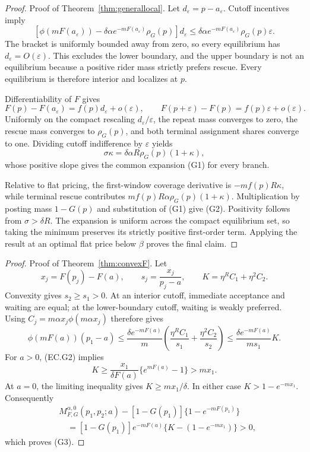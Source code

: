 \documentclass[mnsc,blindrev]{informs3}
\newcommand{\ph}{\phi}
\begin{document}
\begin{proof}{Proof of Theorem~\ref{thm:generallocal}.}
Let \(d_\varepsilon=p-a_\varepsilon\).  Cutoff incentives imply
\[
 [\ph(mF(a_\varepsilon))
 -\delta\alpha e^{-mF(a_\varepsilon)}\rho_G(p)]
 d_\varepsilon
 \le\delta\alpha e^{-mF(a_\varepsilon)}
 \rho_G(p)\varepsilon.                                   \tag{EC.G1}
\]
The bracket is uniformly bounded away from zero, so every equilibrium has
\(d_\varepsilon=O(\varepsilon)\).  This excludes the lower boundary, and the
upper boundary is not an equilibrium because a positive rider mass strictly
prefers rescue.  Every equilibrium is therefore interior and localizes at
\(p\).

Differentiability of \(F\) gives
\[
 F(p)-F(a_\varepsilon)=f(p)d_\varepsilon+o(\varepsilon),
 \qquad
 F(p+\varepsilon)-F(p)=f(p)\varepsilon+o(\varepsilon).
\]
Uniformly on the compact rescaling \(d_\varepsilon/\varepsilon\), the
repeat mass converges to zero, the rescue mass converges to \(\rho_G(p)\),
and both terminal assignment shares converge to one.  Dividing cutoff
indifference by \(\varepsilon\) yields
\[
 \sigma\kappa
 =\delta\alpha R\rho_G(p)(1+\kappa),
\]
whose positive slope gives the common expansion (G1) for every branch.

Relative to flat pricing, the first-window coverage derivative is
\(-mf(p)R\kappa\), while terminal rescue contributes
\(mf(p)R\alpha\rho_G(p)(1+\kappa)\).  Multiplication by posting mass
\(1-G(p)\) and substitution of (G1) give (G2).  Positivity follows from
\(\sigma>\delta R\).  The expansion is uniform across the compact equilibrium
set, so taking the minimum preserves its strictly positive first-order term.
Applying the result at an optimal flat price below \(\beta\) proves the final
claim.
\Halmos\end{proof}

\begin{proof}{Proof of Theorem~\ref{thm:convexF}.}
Let
\[
 x_j=F(p_j)-F(a),\qquad
 s_j=\frac{x_j}{p_j-a},\qquad
 K=\eta^R C_1+\eta^2 C_2.
\]
Convexity gives \(s_2\ge s_1>0\).  At an interior cutoff, immediate acceptance
and waiting are equal; at the lower-boundary cutoff, waiting is weakly
preferred.  Using \(C_j=m\alpha x_j\ph(m\alpha x_j)\) therefore gives
\[
 \ph(mF(a))(p_1-a)
 \le\frac{\delta e^{-mF(a)}}m
 \left(\frac{\eta^RC_1}{s_1}+\frac{\eta^2C_2}{s_2}\right)
 \le\frac{\delta e^{-mF(a)}}{ms_1}K.                     \tag{EC.G2}
\]
For \(a>0\), (EC.G2) implies
\[
 K\ge\frac{x_1}{\delta F(a)}\{e^{mF(a)}-1\}>mx_1.
\]
At \(a=0\), the limiting inequality gives \(K\ge mx_1/\delta\).
In either case \(K>1-e^{-mx_1}\).  Consequently
\[
\begin{aligned}
&M_{F,G}^{\alpha,0}(p_1,p_2;a)
 -[1-G(p_1)]\{1-e^{-mF(p_1)}\}\\
&\quad=[1-G(p_1)]e^{-mF(a)}
 \{K-(1-e^{-mx_1})\}>0,
\end{aligned}
\]
which proves (G3).
\Halmos\end{proof}
\end{document}
